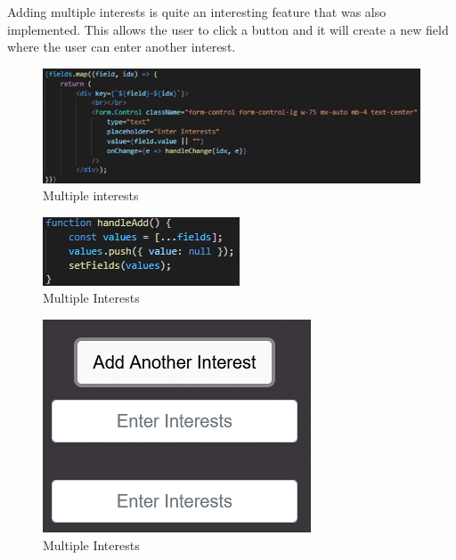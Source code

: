 Adding multiple interests is quite an interesting feature that was also implemented. This allows the user to click a button and it will create a new field where the user can enter another interest. \\
\begin{figure}[H]
    \centering
    \includegraphics{img/register8.png}
    \caption{Multiple interests} 
    \label{fig:my_label}
\end{figure}
\begin{figure}[H]
    \centering
    \includegraphics{img/register9.png}
    \caption{Multiple Interests} 
    \label{fig:my_label}
\end{figure}
\begin{figure}[H]
    \centering
    \includegraphics{img/register10.png}
    \caption{Multiple Interests} 
    \label{fig:my_label}
\end{figure}

